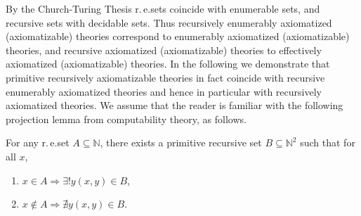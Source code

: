 By the Church-Turing Thesis r.\,e.\@ sets coincide with enumerable sets, and recursive sets with decidable sets. Thus recursively enumerably axiomatized (axiomatizable) theories correspond to enumerably axiomatized (axiomatizable) theories, and recursive axiomatized (axiomatizable) theories to effectively axiomatized (axiomatizable) theories. In the following we demonstrate that primitive recursively axiomatizable theories in fact coincide with recursive enumerably axiomatized theories and hence in particular with recursively axiomatized theories. We assume that the reader is familiar with the following projection lemma from computability theory, as follows.
\begin{lem}
For any r.\,e.\@ set $A\subseteq \mathbb{N}$, there exists a primitive recursive set $B\subseteq \mathbb{N}^2$ such that for all $x$,
\begin{enumerate}
\item $x \in A \Rightarrow \exists ! y (x,y) \in B$,
\item $x \notin A \Rightarrow \nexists y (x,y) \in B$.
\end{enumerate}
\end{lem}
%


